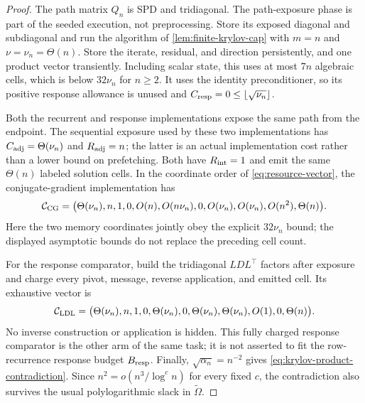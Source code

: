 \begin{proof}
The path matrix $Q_n$ is SPD and tridiagonal.  The path-exposure phase is part
of the seeded execution, not preprocessing.  Store its exposed diagonal and
subdiagonal and run the algorithm of \cref{lem:finite-krylov-cap} with
$m=n$ and $\nu=\nu_n=\Theta(n)$.  Store the iterate, residual, and direction
persistently, and one product vector transiently.  Including scalar state,
this uses at most $7n$ algebraic cells, which is below $32\nu_n$ for $n\geq2$.
It uses the identity preconditioner, so its
positive response allowance is unused and
$C_{\rm resp}=0\leq\lfloor\sqrt{\nu_n}\rfloor$.

Both the recurrent and response implementations expose the same path from the
endpoint.  The sequential exposure used by these two implementations has
$C_{\rm adj}=\Theta(\nu_n)$ and $R_{\rm adj}=n$; the latter is an actual
implementation cost rather than a lower bound on prefetching.  Both have
$R_{\rm int}=1$ and emit the same $\Theta(n)$ labeled solution cells.  In the coordinate
order of \cref{eq:resource-vector}, the conjugate-gradient implementation has
\begin{equation}
 \mathcal C_{\rm CG}=\bigl(
 \Theta(\nu_n),n,1,0,O(n),O(n\nu_n),0,
 O(\nu_n),O(\nu_n),O(n^2),\Theta(n)\bigr).
 \label{eq:path-cg-resource-vector}
\end{equation}
Here the two memory coordinates jointly obey the explicit $32\nu_n$ bound;
the displayed asymptotic bounds do not replace the preceding cell count.

For the response comparator, build the tridiagonal $LDL^\top$ factors after
exposure and charge every pivot, message, reverse application, and emitted
cell.  Its exhaustive vector is
\begin{equation}
 \mathcal C_{\rm LDL}=\bigl(
 \Theta(\nu_n),n,1,0,\Theta(\nu_n),0,\Theta(\nu_n),
 \Theta(\nu_n),O(1),0,\Theta(n)\bigr).
 \label{eq:path-ldl-resource-vector}
\end{equation}
No inverse construction or application is hidden.  This fully charged
response comparator is the other arm of the same task; it is not asserted to
fit the row-recurrence response budget $B_{\rm resp}$.  Finally,
$\sqrt{\alpha_n}=n^{-2}$ gives
\cref{eq:krylov-product-contradiction}.  Since
$n^2=o(n^3/\log^c n)$ for every fixed $c$, the contradiction also survives
the usual polylogarithmic slack in $\widetilde\Omega$.
\end{proof}


